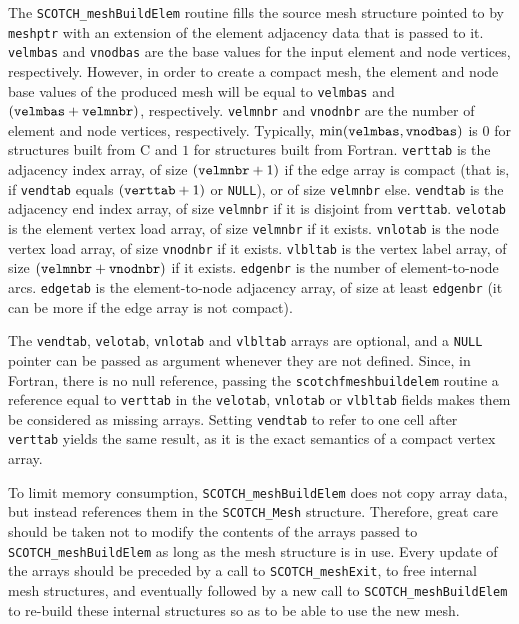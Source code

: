 \begin{itemize}
\progdes

The \texttt{SCOTCH\_meshBuildElem} routine fills the source mesh
structure pointed to by \texttt{meshptr} with an extension of the
element adjacency data that is passed to it.
\texttt{velmbas} and \texttt{vnodbas} are the base values for the
input element and node vertices, respectively. However, in order to
create a compact mesh, the element and node base values of the
produced mesh will be equal to \texttt{velmbas} and
$(\mbox{\texttt{velmbas}} + \mbox{\texttt{velmnbr}})$, respectively.
\texttt{velmnbr} and \texttt{vnodnbr} are the number of element and node
vertices, respectively. Typically,
$\min(\mbox{\texttt{velmbas}}, \mbox{\texttt{vnodbas}})$ is $0$ for
structures built from C and $1$ for structures built from Fortran.
\texttt{verttab} is the adjacency index array, of size
$(\mbox{\texttt{velmnbr}} + 1)$ if the edge array is compact (that is,
if \texttt{vendtab} equals $(\mbox{\texttt{verttab}}+1)$ or
\texttt{NULL}), or of size \texttt{velmnbr} else.
\texttt{vendtab} is the adjacency end index array, of size
\texttt{velmnbr} if it is disjoint from \texttt{verttab}.
\texttt{velotab} is the element vertex load array, of size
\texttt{velmnbr} if it exists.
\texttt{vnlotab} is the node vertex load array, of size
\texttt{vnodnbr} if it exists.
\texttt{vlbltab} is the vertex label array, of size
$(\mbox{\texttt{velmnbr}} + \mbox{\texttt{vnodnbr}})$ if it exists.
\texttt{edgenbr} is the number of element-to-node arcs.
\texttt{edgetab} is the element-to-node adjacency array, of size at
least \texttt{edgenbr} (it can be more if the edge array is not compact).

The \texttt{vendtab}, \texttt{velotab}, \texttt{vnlotab} and
\texttt{vlbltab} arrays are optional, and a \texttt{NULL} pointer can
be passed as argument whenever they are not defined.
Since, in Fortran, there is no null reference, passing the
\texttt{scotchf\lbt mesh\lbo build\lbt elem} routine a reference equal
to \texttt{verttab} in the \texttt{velotab}, \texttt{vnlotab} or
\texttt{vlbltab} fields makes them be considered as missing
arrays. Setting \texttt{vendtab} to refer to one cell after
\texttt{verttab} yields the same result, as it is the exact semantics
of a compact vertex array.

To limit memory consumption,
\texttt{SCOTCH\_\lbt mesh\lbo Build\lbt Elem} does not copy array
data, but instead references them in the
\texttt{SCOTCH\_\lbt Mesh} structure. Therefore, great care should be
taken not to modify the contents of the arrays passed to
\texttt{SCOTCH\_\lbt mesh\lbo Build\lbt Elem} as long as the mesh
structure is in use. Every update of the arrays should be preceded by
a call to \texttt{SCOTCH\_\lbt mesh\lbo Exit}, to free internal mesh
structures, and eventually followed by a new call to
\texttt{SCOTCH\_\lbt mesh\lbo Build\lbt Elem} to re-build these
internal structures so as to be able to use the new mesh.


\end{itemize}
